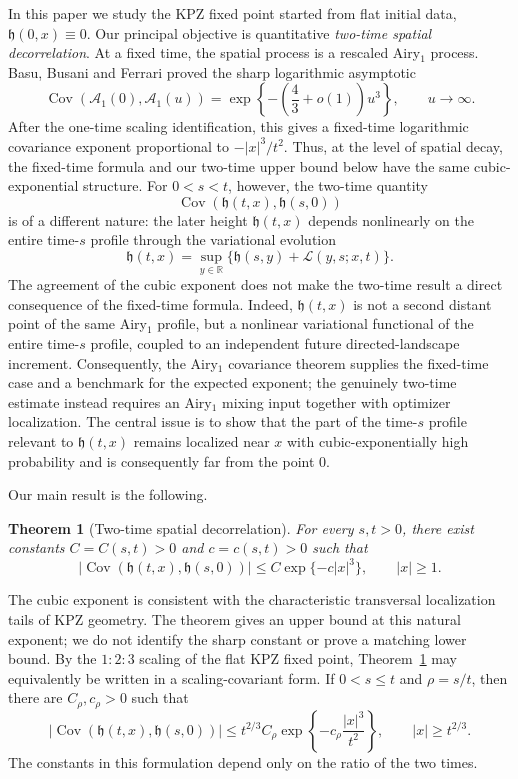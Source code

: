 \documentclass[12pt, reqno]{amsart}
\numberwithin{equation}{section}
\newtheorem{theorem}{Theorem}[section]
\theoremstyle{definition}
\newcommand{\R}{\mathbb{R}}
\newcommand{\h}{\mathfrak{h}}
\newcommand{\Cov}{\operatorname{Cov}}
\newcommand{\Lcal}{\mathcal{L}}
\newcommand{\Acal}{\mathcal{A}}
\begin{document}
In this paper we study the KPZ fixed point started from flat initial data,
$\h(0,x)\equiv0$. Our principal objective is quantitative \emph{two-time spatial
decorrelation}. At a fixed time, the spatial process is a rescaled Airy$_1$
process. Basu, Busani and Ferrari \cite[Theorem~1.1]{basu.busani.ea:23:on}
proved the sharp logarithmic asymptotic
\[
  \Cov(\Acal_1(0),\Acal_1(u))
  =\exp\left\{-\left(\frac43+o(1)\right)u^3\right\},
  \qquad u\to\infty.
\]
After the one-time scaling identification, this gives a fixed-time logarithmic
covariance exponent proportional to $-|x|^3/t^2$. Thus, at the level of spatial
decay, the fixed-time formula and our two-time upper bound below have the same
cubic-exponential structure. For $0<s<t$, however, the two-time quantity
\[
  \Cov(\h(t,x),\h(s,0))
\]
is of a different nature: the later height $\h(t,x)$ depends nonlinearly on the
entire time-$s$ profile through the variational evolution
\[
  \h(t,x)=\sup_{y\in\R}
  \{\h(s,y)+\Lcal(y,s;x,t)\}.
\]
The agreement of the cubic exponent does not make the two-time result a direct
consequence of the fixed-time formula. Indeed, $\h(t,x)$ is not a second distant
point of the same Airy$_1$ profile, but a nonlinear variational functional of
the entire time-$s$ profile, coupled to an independent future
directed-landscape increment. Consequently, the Airy$_1$ covariance theorem
supplies the fixed-time case and a benchmark for the expected exponent; the
genuinely two-time estimate instead requires an Airy$_1$ mixing input together
with optimizer localization.
The central issue is to show that the part of the time-$s$ profile relevant to
$\h(t,x)$ remains localized near $x$ with cubic-exponentially high probability
and is consequently far from the point $0$.

Our main result is the following.

\begin{theorem}[Two-time spatial decorrelation]\label{T:main-decay}
  For every $s,t>0$, there exist constants $C = C(s,t)>0$ and $c = c(s,t)>0$
  such that
  \begin{equation}\label{E:main-decay}
    \big|\Cov(\h(t,x),\h(s,0))\big|
    \le C\exp\{-c|x|^3\},\qquad |x|\ge1.
  \end{equation}
\end{theorem}

The cubic exponent is consistent with the characteristic transversal
localization tails of KPZ geometry. The theorem gives an upper bound at this
natural exponent; we do not identify the sharp constant or prove a matching
lower bound. By the $1:2:3$ scaling of the flat KPZ fixed point,
Theorem~\ref{T:main-decay} may equivalently be written in a scaling-covariant
form. If $0<s\le t$ and $\rho=s/t$, then there are $C_\rho,c_\rho>0$ such that
\begin{equation}\label{E:scaling-covariance-bound}
  \big|\Cov(\h(t,x),\h(s,0))\big|
  \le t^{2/3}C_\rho
  \exp\left\{-c_\rho\frac{|x|^3}{t^2}\right\},
  \qquad |x|\ge t^{2/3}.
\end{equation}
The constants in this formulation depend only on the ratio of the two times.
\end{document}
